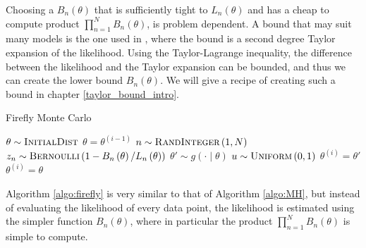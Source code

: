 Choosing a $B_n\left(\theta\right)$ that is sufficiently tight to $L_n\left(\theta\right)$ and has a cheap to compute product $\prod_{n=1}^N B_n\left(\theta\right)$, is problem dependent. A bound that may suit many models is the one used in \cite{Bardenet:1}, where the bound is a second degree Taylor  expansion of the likelihood. Using the Taylor-Lagrange inequality, the difference between the likelihood and the Taylor expansion can be bounded, and thus we can create the lower bound $B_n\left(\theta\right)$. We will give a recipe of creating such a bound in chapter \ref{taylor_bound_intro}.    


\begin{algorithm}[H]
    \caption{Firefly Monte Carlo}
    \label{algo:firefly}
    \begin{algorithmic}[1] %
        \State $\theta \sim \textsc{InitialDist}$ 
        \State $\theta = \theta^{\left(i-1\right)}$
        \State $n\sim \textsc{RandInteger}\left(1, N\right)$
        \State $z_n \sim \textsc{Bernoulli}\left(1 - B_n\left(\theta\right)/L_n\left(\theta\right)\right) $ \label{algo:firefly:z}
        \EndFor
        \State$\theta' \sim g\left(\cdot\mid\theta\right)$
        \State $u\sim \textsc{Uniform}\left(0,1\right)$
         \label{algo:firefly:accept_reject}
        \State $\theta^{\left(i\right)} = \theta '$
        \Else 
        \State $\theta^{\left(i\right)} = \theta$
         \EndIf
         \EndFor

    \end{algorithmic}
\end{algorithm}
Algorithm \ref{algo:firefly} is very similar to that of Algorithm \ref{algo:MH}, but instead of evaluating the likelihood of every data point, the likelihood is estimated using the simpler function $B_n\left(\theta\right)$, where in particular the product $\prod_{n=1}^N B_n\left(\theta\right)$ is simple to compute.
